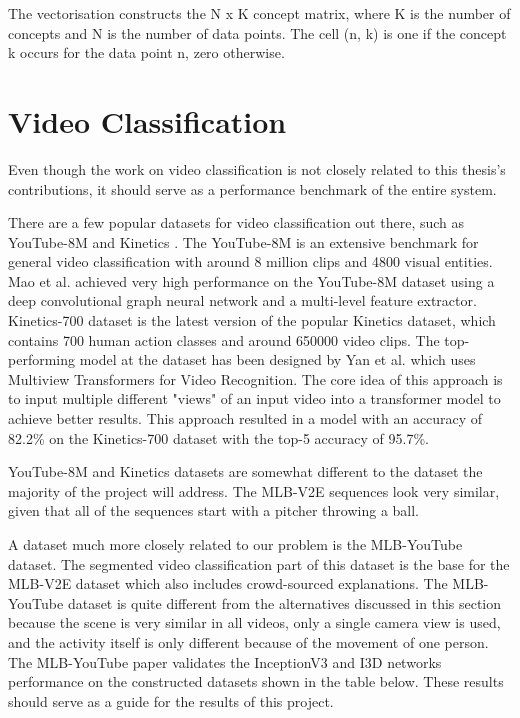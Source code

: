 The vectorisation constructs the N x K concept matrix, where K is the number of concepts and N is the number of data points. 
The cell (n, k) is one if the concept k occurs for the data point n, zero otherwise.

\section{Video Classification}

Even though the work on video classification is not closely related to this thesis's contributions, it should serve as a performance benchmark of the entire system.

There are a few popular datasets for video classification out there, such as YouTube-8M \cite{RefWorks:RefID:10-abu-el-haija2016youtube-8m:} and Kinetics \cite{RefWorks:RefID:9-carreira2017quo}.
The YouTube-8M \cite{RefWorks:RefID:10-abu-el-haija2016youtube-8m:} is an extensive benchmark for general video classification with around 8 million clips and 4800 visual entities.
Mao et al. \cite{RefWorks:RefID:4-mao2019hierarchical} achieved very high performance on the YouTube-8M dataset using a deep convolutional graph neural network and a multi-level feature extractor.
Kinetics-700 \cite{RefWorks:RefID:14-carreira2019short} dataset is the latest version of the popular Kinetics dataset, which contains 700 human action classes and around 650000 video clips.
The top-performing model at the dataset has been designed by Yan et al. which uses Multiview Transformers for Video Recognition. 
The core idea of this approach is to input multiple different "views" of an input video into a transformer model to achieve better results.
This approach resulted in a model with an accuracy of 82.2\% on the Kinetics-700 dataset with the top-5 accuracy of 95.7\%.

YouTube-8M and Kinetics datasets are somewhat different to the dataset the majority of the project will address.
The MLB-V2E sequences look very similar, given that all of the sequences start with a pitcher throwing a ball.

A dataset much more closely related to our problem is the MLB-YouTube \cite{RefWorks:RefID:3-piergiovanni2018fine-grained} dataset.
The segmented video classification part of this dataset is the base for the MLB-V2E \cite{RefWorks:RefID:16-2021automatic} dataset which also includes crowd-sourced explanations. 
The MLB-YouTube dataset is quite different from the alternatives discussed in this section because the scene is very similar in all videos, only a single camera view is used, and the activity itself is only different because of the movement of one person.
The MLB-YouTube paper validates the InceptionV3 \cite{RefWorks:RefID:49-szegedy2016rethinking} and I3D \cite{RefWorks:RefID:9-carreira2017quo} networks performance on the constructed datasets shown in the table below.
These results should serve as a guide for the results of this project.

